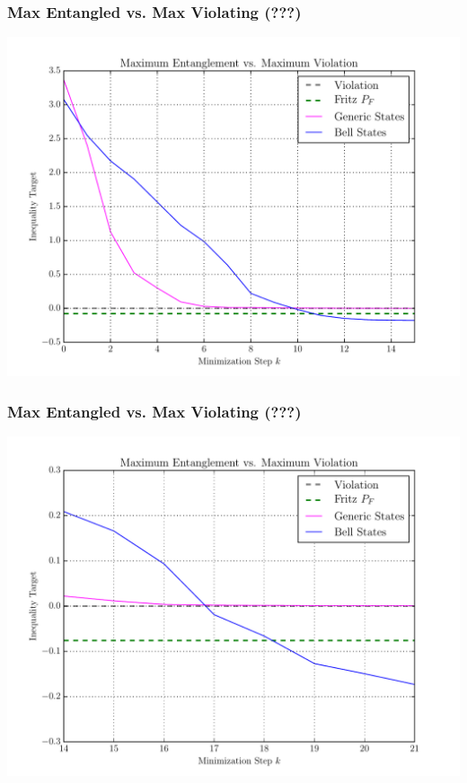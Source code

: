 \documentclass[
    hyperref={bookmarks=false},%
    xcolor={dvipsnames},
]{beamer}
\begin{document}
\begin{frame}
    \frametitle{Max Entangled vs. Max Violating (???)}
    \includegraphics[width=\linewidth]{../../figures/optimizations/Max_Entanglement_vs_Max_Violation_random_seed.pdf}
\end{frame}

\begin{frame}
    \frametitle{Max Entangled vs. Max Violating (???)}
    \includegraphics[width=\linewidth]{../../figures/optimizations/Max_Entanglement_vs_Max_Violation_random_seed_Zoomed.pdf}
\end{frame}
\end{document}
